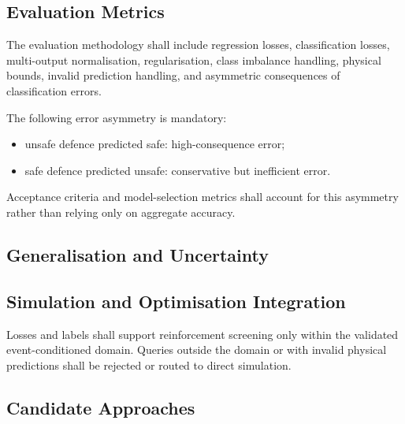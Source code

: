 
\subsection{Evaluation Metrics}
\label{sec:res-ml-obj-evaluation-metrics}

The evaluation methodology shall include regression losses, classification
losses, multi-output normalisation, regularisation, class imbalance handling,
physical bounds, invalid prediction handling, and asymmetric consequences of
classification errors.

The following error asymmetry is mandatory:
\begin{itemize}
  \item unsafe defence predicted safe: high-consequence error;
  \item safe defence predicted unsafe: conservative but inefficient error.
\end{itemize}

Acceptance criteria and model-selection metrics shall account for this
asymmetry rather than relying only on aggregate accuracy.

\subsection{Generalisation and Uncertainty}
\label{sec:res-ml-obj-generalisation-uncertainty}


\subsection{Simulation and Optimisation Integration}
\label{sec:res-ml-obj-simulation-optimisation-integration}

Losses and labels shall support reinforcement screening only within the
validated event-conditioned domain. Queries outside the domain or with invalid
physical predictions shall be rejected or routed to direct simulation.

\subsection{Candidate Approaches}
\label{sec:res-ml-obj-candidate-approaches}


